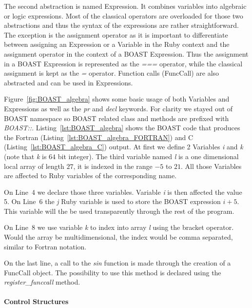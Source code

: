 \documentclass{IEEEtran}
\begin{document}
The second abstraction is named Expression. It combines variables into
algebraic or logic expressions. Most of the classical operators are overloaded
for those two abstractions and thus the syntax of the expressions are rather
straightforward. The exception is the assignment operator as it is important to
differentiate between assigning an Expression or a Variable in the Ruby context
and the assignment operator in the context of a BOAST Expression. Thus the
assignment in a BOAST Expression is represented as the \emph{===} operator,
while the classical assignment is kept as the \emph{=} operator. Function calls
(FuncCall) are also abstracted and can be used in Expressions.

Figure~\ref{fig:BOAST_algebra} shows some basic usage of both Variables and
Expressions as well as the \emph{pr} and \emph{decl} keywords. For clarity we
stayed out of BOAST namespace so BOAST related class and methods are prefixed
with \emph{BOAST::}. Listing~\ref{lst:BOAST_algebra} shows the BOAST code that
produces the Fortran (Listing~\ref{lst:BOAST_algebra_FORTRAN}) and C
(Listing~\ref{lst:BOAST_algebra_C}) output. At first we define 2 Variables
\emph{i} and \emph{k} (note that \emph{k} is $64$ bit integer). The third
variable named \emph{l} is a one dimensional local array of length $27$, it
is indexed in the range $-5$ to $21$. All those Variables are affected to Ruby
variables of the corresponding name.

On Line~4 we declare those three variables. Variable \emph{i} is then affected
the value 5. On Line~6 the \emph{j} Ruby variable is used to store the BOAST
expression \emph{$i+5$}. This variable will the be used transparently through
the rest of the program.

On Line~8 we use variable \emph{k} to index into array \emph{l} using the
bracket operator. Would the array be multidimensional, the index would be comma
separated, similar to Fortran notation.

On the last line, a call to the \emph{sin} function is made through the creation
of a FuncCall object.  The possibility to use this method is declared using the
\emph{register\_funccall} method.

      \paragraph{Control Structures}
\end{document}
